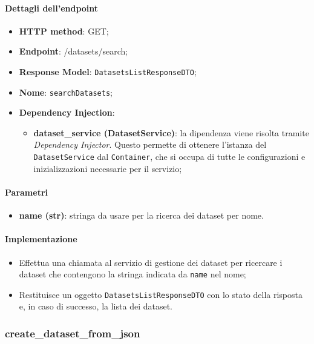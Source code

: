 \paragraph{Dettagli dell'endpoint}
\begin{itemize}
    \item \textbf{HTTP method}: GET;
    \item \textbf{Endpoint}: /datasets/search;
    \item \textbf{Response Model}: \texttt{DatasetsListResponseDTO};
    \item \textbf{Nome}: \texttt{searchDatasets};
    \item \textbf{Dependency Injection}: 
    \begin{itemize}
        \item \textbf{dataset\_service (DatasetService)}: la dipendenza viene risolta tramite \textit{Dependency Injector}. Questo permette di ottenere l'istanza del \texttt{DatasetService} dal \texttt{Container}, che si occupa di tutte le configurazioni e inizializzazioni necessarie per il servizio;
    \end{itemize}
\end{itemize}

\paragraph{Parametri}
\begin{itemize}
    \item \textbf{name (str)}: stringa da usare per la ricerca dei dataset per nome.
\end{itemize}

\paragraph{Implementazione}
\begin{itemize}
    \item Effettua una chiamata al servizio di gestione dei dataset per ricercare i dataset che contengono la stringa indicata da \texttt{name} nel nome;
    \item Restituisce un oggetto \texttt{DatasetsListResponseDTO} con lo stato della risposta e, in caso di successo, la lista dei dataset.
\end{itemize}

\subsubsection{create\_dataset\_from\_json}
